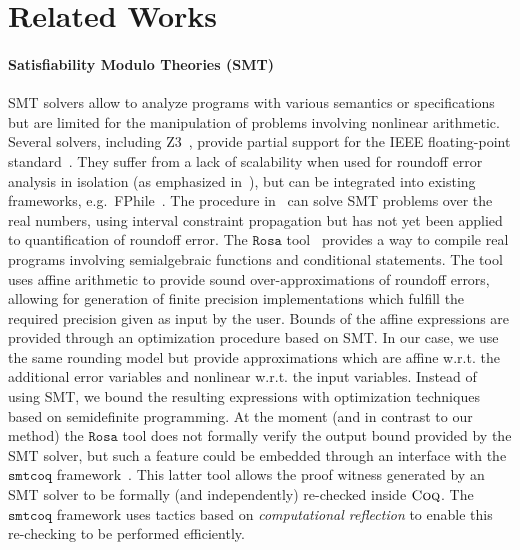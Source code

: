 \documentclass[preprint,fleqn,nocopyrightspace]{sigplanconf}
\newcommand{\smtcoq}{\mathtt{smtcoq}}
\newcommand{\coq}{\text{\sc Coq}}
\newcommand{\rosa}{\mathtt{Rosa}}
\theoremstyle{plain}
\begin{document}
\section{Related Works}
%
\paragraph{Satisfiability Modulo Theories (SMT)}
SMT solvers allow to analyze programs with various semantics or specifications but are limited for the manipulation of problems involving nonlinear arithmetic. 
Several solvers, including {\sc Z3}~\cite{DeMoura08}, provide partial support for the IEEE floating-point standard~\cite{smtFPA2010}. They suffer from a lack of scalability when used for roundoff error analysis in isolation (as emphasized in~\cite{Darulova14Popl}), but can be integrated into existing frameworks, e.g.~{\sc FPhile}~\cite{PaganelliA13}. The procedure in~\cite{dReal13} can solve SMT problems over the real numbers, using interval constraint propagation but has not yet been applied to quantification of roundoff error.
The $\rosa$ tool~\cite{Darulova14Popl} provides a way to compile real programs involving semialgebraic functions and conditional statements.
The tool uses affine arithmetic to provide sound over-approximations of roundoff errors, allowing for generation of finite precision implementations which fulfill the required precision given as input by the user. Bounds of the affine expressions are provided through an optimization procedure based on SMT. In our case, we use the same rounding model but provide approximations which are affine w.r.t. the additional error variables and nonlinear w.r.t. the input variables. Instead of using SMT, we bound the resulting expressions with optimization techniques based on semidefinite programming.
At the moment (and in contrast to our method) the $\rosa$ tool does not formally verify the output bound provided by the SMT solver, but such a feature could be embedded through an interface with the $\smtcoq$ framework~\cite{smtcoq}. This latter tool allows the proof witness generated by an SMT solver to be formally (and independently) re-checked inside $\coq$.  
The $\smtcoq$ framework uses tactics based on {\em computational reflection} to enable this re-checking to be performed efficiently.
%
\end{document}
